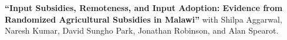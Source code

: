 \documentclass[letterpaper, margin, 10pt]{res} %
\newcommand{\blank}[1]{\hspace*{#1}\linebreak[0]}
\begin{document}
\begin{resume}
 {\bf ``{Input Subsidies, Remoteness, and Input Adoption: Evidence from Randomized Agricultural Subsidies in Malawi}''}
 with Shilpa Aggarwal, Naresh Kumar, David Sungho Park, Jonathan Robinson, and Alan Spearot.
 



 

%


\end{resume}
\end{document}
